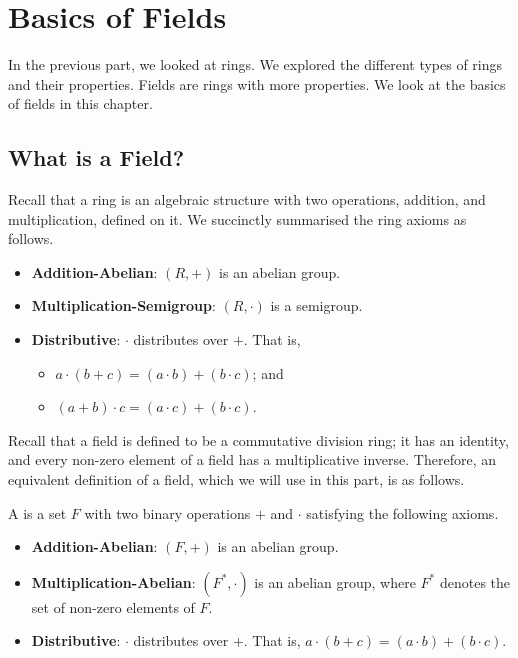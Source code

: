 \chapter{Basics of Fields}
In the previous part, we looked at rings. We explored the different types of rings and their properties. Fields are rings with more properties. We look at the basics of fields in this chapter.

\section{What is a Field?}
Recall that a ring is an algebraic structure with two operations, addition, and multiplication, defined on it. We succinctly summarised the ring axioms as follows.
\begin{itemize}
    \item \textbf{Addition-Abelian}: $(R, +)$ is an abelian group.
    \item \textbf{Multiplication-Semigroup}: $(R, \cdot)$ is a semigroup.
    \item \textbf{Distributive}: $\cdot$ distributes over $+$. That is,
    \begin{itemize}
        \item $a \cdot (b + c) = (a \cdot b) + (b \cdot c)$; and
        \item $(a + b) \cdot c = (a \cdot c) + (b \cdot c)$.
    \end{itemize}
\end{itemize}

Recall that a field is defined to be a commutative division ring; it has an identity, and every non-zero element of a field has a multiplicative inverse. Therefore, an equivalent definition of a field, which we will use in this part, is as follows.
\begin{definition}
    A  is a set $F$ with two binary operations $+$ and $\cdot$ satisfying the following axioms.
    \begin{itemize}
        \item \textbf{Addition-Abelian}: $(F, +)$ is an abelian group.
        \item \textbf{Multiplication-Abelian}: $(F^\ast, \cdot)$ is an abelian group, where $F^\ast$ denotes the set of non-zero elements of $F$.
        \item \textbf{Distributive}: $\cdot$ distributes over $+$. That is, $a \cdot (b + c) = (a \cdot b) + (b \cdot c)$.
    \end{itemize}
\end{definition}

